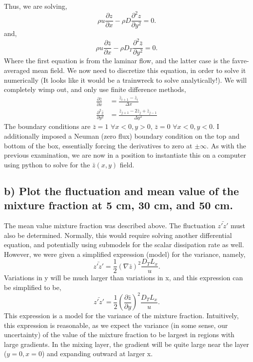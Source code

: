 \documentclass{article}
\begin{document}
Thus, we are solving, 
\begin{equation}
\rho u \frac{\partial z}{\partial x} - \rho D \frac{\partial^2
  z}{\partial y^2} = 0. 
\end{equation}
and, 
\begin{equation}
\rho u \frac{\partial \bar z}{\partial x} - \rho D_T \frac{\partial^2
  \bar z}{\partial y^2} = 0. 
\end{equation}
Where the first equation is from the laminar flow, and the latter case
is the favre-averaged mean field. We now need to discretize this equation, 
in order to solve it numerically (It looks like it would be a trainwreck to solve
analytically!). We will completely wimp out, and only use finite difference methods, 
\begin{align}
  \frac{\partial \bar z}{\partial x} &= \frac{\bar z_{i+1}-\bar z_{i}}{\Delta x} \\
  \label{first}
  \frac{\partial^2 \bar z}{\partial y^2} &= \frac{\bar z_{j+1}-2\bar z_{j}+\bar z_{j-1}}{\Delta y^2} 
\end{align}
The boundary conditions are $\bar z = 1$ $\forall x<0,y>0$, $\bar z = 0$ $\forall x<0,y<0$. 
I additionally imposed a Neuman (zero flux) boundary condition on the top and bottom of the box, 
essentially forcing the derivatives to zero at $\pm \infty$. As with the previous examination, 
we are now in a position to instantiate this on a computer using python to solve for 
the $\bar z(x,y)$ field. 

%
%
%
%
\subsection*{b) Plot the fluctuation and mean value of the mixture fraction
  at 5 cm, 30 cm, and 50 cm.}

The mean value mixture fraction was described above. The fluctuation $\bar{z'z'}$
must also be determined. Normally, this would require solving another differential equation, 
and potentially using submodels for the scalar dissipation rate as well. However, we were given a
simplified expression (model) for the variance, namely,
\begin{equation}
 \bar{z'z'} = \frac{1}{2} (\nabla \bar z)^2 \frac{D_T L_x}{u}. 
\end{equation}
Variations in y will be much larger than variations in x, and this expression 
can be simplified to be,
\begin{equation}
 \bar{z'z'} = \frac{1}{2} (\frac{\partial \bar z}{\partial y})^2 \frac{D_T L_x}{u}. 
 \label{fluc}
\end{equation}
This expression is a model for the variance of the mixture fraction. Intuitively, this expression is reasonable, 
as we expect the variance (in some sense, our uncertainty) of the value of the mixture fraction to be largest in regions 
with large gradients. In the mixing layer, the gradient will be quite large near the layer ($y=0,x=0$) and expanding outward 
at larger x. 
\end{document}
